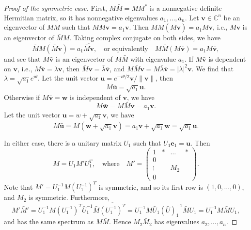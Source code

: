 \documentclass[11pt, a4paper]{article}
\numberwithin{equation}{section}
\newcommand{\compC}{\mathbb{C}}
\newcommand{\ie}{i.e.}
\renewcommand{\vec}[1]{\mathbf{#1}}
\theoremstyle{definition}
\theoremstyle{remark}
\begin{document}
\begin{proof}[Proof of the symmetric case]
  First, $M \bar{M} = M M^*$ is a nonnegative definite Hermitian matrix, so it has nonnegative eigenvalues $a_1, \dotsc, a_n$. Let $\vec{v} \in \compC^n$ be an eigenvector of $M \bar{M}$ such that $M \bar{M} \vec{v} = a_1 \vec{v}$. Then $\bar{M} M (\bar{M} \vec{v}) = a_1 \bar{M} \vec{v}$, \ie, $\bar{M} \vec{v}$ is an eigenvector of $\bar{M} M$. Taking complex conjugate on both sides, we have
\begin{equation}
  \overline{\bar{M} M (\bar{M} \vec{v})} = a_1 \overline{\bar{M} \vec{v}}, \quad \text{or equivalently} \quad M \bar{M}(M \bar{\vec{v}}) = a_1 M \bar{\vec{v}},
\end{equation}
and see that $M \bar{\vec{v}}$ is an eigenvector of $M \bar{M}$ with eigenvalue $a_1$. If $M \bar{\vec{v}}$ is dependent on $\vec{v}$, \ie, $M \bar{\vec{v}} = \lambda \vec{v}$, then $\bar{M} \vec{v} = \bar{\lambda} \bar{\vec{v}}$, and $M \bar{M} \vec{v} = M \bar{\lambda} \bar{\vec{v}} = \lvert \lambda \rvert^2 \vec{v}$. We find that $\lambda = \sqrt{a_1} e^{i\theta}$. Let the unit vector $\vec{u} = e^{-i\theta/2} \vec{v} / \lVert \vec{v} \rVert$, then
\begin{equation}
  M \bar{\vec{u}} = \sqrt{a_1} \vec{u}.
\end{equation}
Otherwise if $M \bar{\vec{v}} = \vec{w}$ is independent of $\vec{v}$, we have
\begin{equation}
  M \bar{\vec{w}} = M \bar{M} \vec{v} = a_1 \vec{v}.
\end{equation}
Let the unit vector $\vec{u} = w + \sqrt{a_1} \vec{v}$, we have
\begin{equation}
  M \bar{\vec{u}} = M(\bar{\vec{w}} + \sqrt{a_1} \bar{\vec{v}}) = a_1 \vec{v} + \sqrt{a_1} \vec{w} = \sqrt{a_1} \vec{u}.
\end{equation}

In either case, there is a unitary matrix $U_1$ such that $U_1 \vec{e}_1 = \vec{u}$. Then
\begin{equation}
  M = U_1 M' U^T_1, \quad \text{where} \quad M' =
  \begin{pmatrix}
    1 & * & \dots & * \\
    0 & & & \\
    \vdots & & M_2 & \\
    0 & & &
  \end{pmatrix}.
\end{equation}
Note that $M' = U^{-1}_1 M (U^{-1}_1)^T$ is symmetric, and so its first row is $(1, 0, \dotsc, 0)$, and $M_2$ is symmetric. Furthermore,
\begin{equation}
  M' \bar{M}' = U^{-1}_1 M (U^{-1}_1)^T \bar{U}^{-1}_1 \bar{M} \overline{(U^{-1}_1)^T} = U^{-1}_1 M \bar{U}_1 (\bar{U})^{-1}_1 \bar{M} U_1 = U^{-1}_1 M \bar{M} U_1,
\end{equation}
and has the same spectrum as $M \bar{M}$. Hence $M_2 \bar{M}_2$ has eigenvalues $a_2, \dots, a_n$.


\end{proof}
\end{document}
